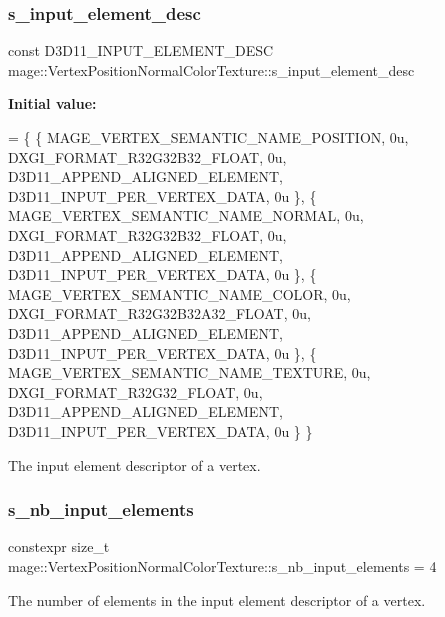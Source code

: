 \subsubsection{\texorpdfstring{s\+\_\+input\+\_\+element\+\_\+desc}{s\_input\_element\_desc}}
{\footnotesize\ttfamily const D3\+D11\+\_\+\+I\+N\+P\+U\+T\+\_\+\+E\+L\+E\+M\+E\+N\+T\+\_\+\+D\+E\+SC mage\+::\+Vertex\+Position\+Normal\+Color\+Texture\+::s\+\_\+input\+\_\+element\+\_\+desc\hspace{0.3cm}{\ttfamily [static]}}

{\bfseries Initial value\+:}
\begin{DoxyCode}
= \{
        \{ MAGE\_VERTEX\_SEMANTIC\_NAME\_POSITION, 0u, DXGI\_FORMAT\_R32G32B32\_FLOAT,    0u, 
      D3D11\_APPEND\_ALIGNED\_ELEMENT, D3D11\_INPUT\_PER\_VERTEX\_DATA, 0u \},
        \{ MAGE\_VERTEX\_SEMANTIC\_NAME\_NORMAL,   0u, DXGI\_FORMAT\_R32G32B32\_FLOAT,    0u, 
      D3D11\_APPEND\_ALIGNED\_ELEMENT, D3D11\_INPUT\_PER\_VERTEX\_DATA, 0u \},
        \{ MAGE\_VERTEX\_SEMANTIC\_NAME\_COLOR,    0u, DXGI\_FORMAT\_R32G32B32A32\_FLOAT, 0u, 
      D3D11\_APPEND\_ALIGNED\_ELEMENT, D3D11\_INPUT\_PER\_VERTEX\_DATA, 0u \},
        \{ MAGE\_VERTEX\_SEMANTIC\_NAME\_TEXTURE,  0u, DXGI\_FORMAT\_R32G32\_FLOAT,       0u, 
      D3D11\_APPEND\_ALIGNED\_ELEMENT, D3D11\_INPUT\_PER\_VERTEX\_DATA, 0u \}
    \}
\end{DoxyCode}
The input element descriptor of a vertex. \hypertarget{structmage_1_1_vertex_position_normal_color_texture_aec9480e361ddffcbcb29cd58a0c33aff}{}\label{structmage_1_1_vertex_position_normal_color_texture_aec9480e361ddffcbcb29cd58a0c33aff} 
\subsubsection{\texorpdfstring{s\+\_\+nb\+\_\+input\+\_\+elements}{s\_nb\_input\_elements}}
{\footnotesize\ttfamily constexpr size\+\_\+t mage\+::\+Vertex\+Position\+Normal\+Color\+Texture\+::s\+\_\+nb\+\_\+input\+\_\+elements = 4\hspace{0.3cm}{\ttfamily [static]}}

The number of elements in the input element descriptor of a vertex. 